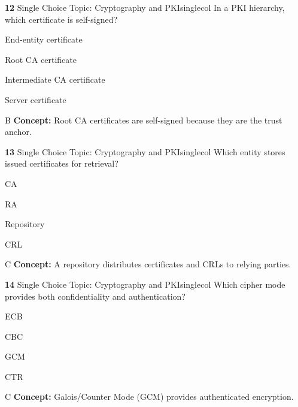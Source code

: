 \documentclass[10pt,a4paper]{article}
\begin{document}
\begin{qcard}{\color{white}\textbf{12} \hfill \small Single Choice \textbar{} Topic: Cryptography and PKI}{singlecol}
In a PKI hierarchy, which certificate is self-signed?

\begin{qoptions}
\item End-entity certificate
\item Root CA certificate
\item Intermediate CA certificate
\item Server certificate
\end{qoptions}
\begin{explainbox}{B}
\textbf{Concept:} Root CA certificates are self-signed because they are the trust anchor.
\end{explainbox}
\end{qcard}

\begin{qcard}{\color{white}\textbf{13} \hfill \small Single Choice \textbar{} Topic: Cryptography and PKI}{singlecol}
Which entity stores issued certificates for retrieval?

\begin{qoptions}
\item CA
\item RA
\item Repository
\item CRL
\end{qoptions}
\begin{explainbox}{C}
\textbf{Concept:} A repository distributes certificates and CRLs to relying parties.
\end{explainbox}
\end{qcard}

\begin{qcard}{\color{white}\textbf{14} \hfill \small Single Choice \textbar{} Topic: Cryptography and PKI}{singlecol}
Which cipher mode provides both confidentiality and authentication?

\begin{qoptions}
\item ECB
\item CBC
\item GCM
\item CTR
\end{qoptions}
\begin{explainbox}{C}
\textbf{Concept:} Galois/Counter Mode (GCM) provides authenticated encryption.
\end{explainbox}
\end{qcard}
\end{document}
